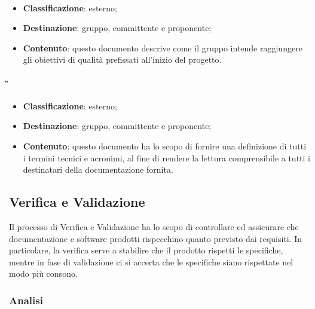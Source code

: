 			\paragraph{\PdQ}
			\begin{itemize}
				\item \textbf{Classificazione}: esterno;
				\item \textbf{Destinazione}: gruppo, committente e proponente;
				\item \textbf{Contenuto}: questo documento descrive come il gruppo \textit{\gruppo} intende raggiungere gli obiettivi di qualità prefissati all’inizio del progetto.
			\end{itemize}

			\paragraph{\G}
			\begin{itemize}
				\item \textbf{Classificazione}: esterno;
				\item \textbf{Destinazione}: gruppo, committente e proponente;
				\item \textbf{Contenuto}: questo documento ha lo scopo di fornire una definizione di tutti i termini tecnici e acronimi, al fine di rendere la lettura comprensibile a tutti i destinatari della documentazione fornita.
			\end{itemize}

	\subsection{Verifica e Validazione}
	Il processo di Verifica e Validazione ha lo scopo di controllare ed assicurare che documentazione e software prodotti rispecchino quanto previsto dai requisiti. In particolare, la verifica serve a stabilire che il prodotto rispetti le specifiche, mentre in fase di validazione ci si accerta che le specifiche siano rispettate nel modo più consono.

		\subsubsection{Analisi}

